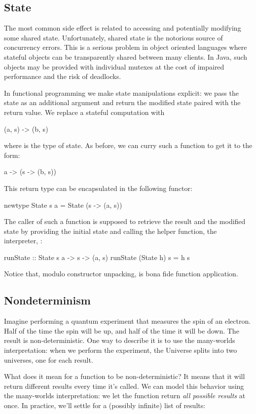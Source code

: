 \documentclass[DaoFP]{subfiles}
\begin{document}
\subsection{State}

The most common side effect is related to accessing and potentially modifying some shared state. Unfortunately, shared state is the notorious source of concurrency errors. This is a serious problem in object oriented languages where stateful objects can be transparently shared between many clients. In Java, such objects may be provided with individual mutexes at the cost of impaired performance and the risk of deadlocks.

In functional programming we make state manipulations explicit: we pass the state as an additional argument and return the modified state paired with the return value. We replace a stateful computation  with
\begin{haskell}
(a, s) -> (b, s)
\end{haskell}
where  is the type of state. As before, we can curry such a function to get it to the form:
\begin{haskell}
a -> (s -> (b, s))
\end{haskell}
This return type can be encapsulated in the following functor:
\begin{haskell}
newtype State s a = State (s -> (a, s))
\end{haskell}
The caller of such a function is supposed to retrieve the result and the modified state by providing the initial state and calling the helper function, the interpreter, :
\begin{haskell}
runState :: State s a -> s -> (a, s)
runState (State h) s = h s
\end{haskell}
Notice that, modulo constructor unpacking,  is bona fide function application. 

\subsection{Nondeterminism}

Imagine performing a quantum experiment that measures the spin of an electron. Half of the time the spin will be up, and half of the time it will be down. The result is non-deterministic. One way to describe it is to use the many-worlds interpretation: when we perform the experiment, the Universe splits into two universes, one for each result.  

What does it mean for a function to be non-deterministic? It means that it will return different results every time it's called. We can model this behavior using the many-worlds interpretation: we let the function return \emph{all possible results} at once. In practice, we'll settle for a (possibly infinite) list of results:
\end{document}
